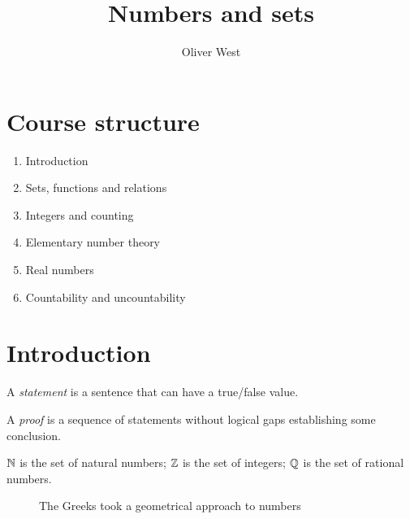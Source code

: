 \documentclass{../../template/note}
\author{Oliver West}
\title{Numbers and sets}
\date{}
\begin{document}
    
    \maketitle

    \tableofcontents


    \setcounter{section}{-1}
    \section{Course structure}

    \begin{enumerate}[label=\protect\circled{\arabic*}]
        \item Introduction
        \item Sets, functions and relations
        \item Integers and counting
        \item Elementary number theory
        \item Real numbers
        \item Countability and uncountability
    \end{enumerate}

    \section{Introduction}

    \begin{definition}
        A \emph{statement} is a sentence that can have a true/false value.
    \end{definition}

    \begin{definition}
        A \emph{proof} is a sequence of statements without logical gaps establishing some conclusion.
    \end{definition}
    
    \begin{definition}
        \(\mathbb N\) is the set of natural numbers; \(\mathbb Z\) is the set of integers; \(\mathbb Q\) is the set of rational numbers.
    \end{definition}

    \begin{figure}[ht]
        \centering
        \caption{The Greeks took a geometrical approach to numbers}
        \label{fig:greek-geometry}
    \end{figure}
\end{document}
